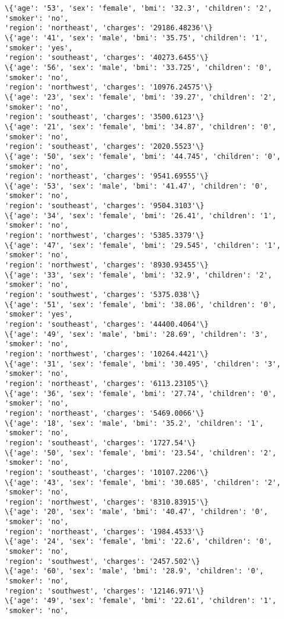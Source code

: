 \documentclass[11pt]{article}
\begin{document}
\begin{Verbatim}[commandchars=\\\{\}]
\{'age': '53', 'sex': 'female', 'bmi': '32.3', 'children': '2', 'smoker': 'no',
'region': 'northeast', 'charges': '29186.48236'\}
\{'age': '41', 'sex': 'male', 'bmi': '35.75', 'children': '1', 'smoker': 'yes',
'region': 'southeast', 'charges': '40273.6455'\}
\{'age': '56', 'sex': 'male', 'bmi': '33.725', 'children': '0', 'smoker': 'no',
'region': 'northwest', 'charges': '10976.24575'\}
\{'age': '23', 'sex': 'female', 'bmi': '39.27', 'children': '2', 'smoker': 'no',
'region': 'southeast', 'charges': '3500.6123'\}
\{'age': '21', 'sex': 'female', 'bmi': '34.87', 'children': '0', 'smoker': 'no',
'region': 'southeast', 'charges': '2020.5523'\}
\{'age': '50', 'sex': 'female', 'bmi': '44.745', 'children': '0', 'smoker': 'no',
'region': 'northeast', 'charges': '9541.69555'\}
\{'age': '53', 'sex': 'male', 'bmi': '41.47', 'children': '0', 'smoker': 'no',
'region': 'southeast', 'charges': '9504.3103'\}
\{'age': '34', 'sex': 'female', 'bmi': '26.41', 'children': '1', 'smoker': 'no',
'region': 'northwest', 'charges': '5385.3379'\}
\{'age': '47', 'sex': 'female', 'bmi': '29.545', 'children': '1', 'smoker': 'no',
'region': 'northwest', 'charges': '8930.93455'\}
\{'age': '33', 'sex': 'female', 'bmi': '32.9', 'children': '2', 'smoker': 'no',
'region': 'southwest', 'charges': '5375.038'\}
\{'age': '51', 'sex': 'female', 'bmi': '38.06', 'children': '0', 'smoker': 'yes',
'region': 'southeast', 'charges': '44400.4064'\}
\{'age': '49', 'sex': 'male', 'bmi': '28.69', 'children': '3', 'smoker': 'no',
'region': 'northwest', 'charges': '10264.4421'\}
\{'age': '31', 'sex': 'female', 'bmi': '30.495', 'children': '3', 'smoker': 'no',
'region': 'northeast', 'charges': '6113.23105'\}
\{'age': '36', 'sex': 'female', 'bmi': '27.74', 'children': '0', 'smoker': 'no',
'region': 'northeast', 'charges': '5469.0066'\}
\{'age': '18', 'sex': 'male', 'bmi': '35.2', 'children': '1', 'smoker': 'no',
'region': 'southeast', 'charges': '1727.54'\}
\{'age': '50', 'sex': 'female', 'bmi': '23.54', 'children': '2', 'smoker': 'no',
'region': 'southeast', 'charges': '10107.2206'\}
\{'age': '43', 'sex': 'female', 'bmi': '30.685', 'children': '2', 'smoker': 'no',
'region': 'northwest', 'charges': '8310.83915'\}
\{'age': '20', 'sex': 'male', 'bmi': '40.47', 'children': '0', 'smoker': 'no',
'region': 'northeast', 'charges': '1984.4533'\}
\{'age': '24', 'sex': 'female', 'bmi': '22.6', 'children': '0', 'smoker': 'no',
'region': 'southwest', 'charges': '2457.502'\}
\{'age': '60', 'sex': 'male', 'bmi': '28.9', 'children': '0', 'smoker': 'no',
'region': 'southwest', 'charges': '12146.971'\}
\{'age': '49', 'sex': 'female', 'bmi': '22.61', 'children': '1', 'smoker': 'no',

\end{Verbatim}
\end{document}
